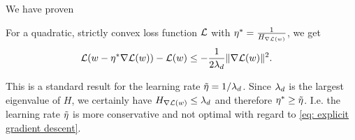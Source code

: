 We have proven
\begin{lemma}\label{lem: improvement guarantee}
	For a quadratic, strictly convex loss function \(\mathcal{L}\) with \(\eta^*=
	\frac{1}{H_{\nabla\mathcal{L}(w)}}\), we get
	\begin{align*}
	\mathcal{L}(w-\eta^*\nabla\mathcal{L}(w)) - \mathcal{L}(w)
	&\le -\frac1{2\lambda_d} \|\nabla\mathcal{L}(w)\|^2.
	\end{align*}	
\end{lemma}
\begin{remark}
	This is a standard result for the learning rate \(\tilde{\eta}=1/\lambda_d\).
	Since \(\lambda_d\) is the largest eigenvalue of \(H\), we certainly
	have \(H_{\nabla\mathcal{L}(w)}\le \lambda_d\) and therefore \(\eta^* \ge
	\tilde{\eta}\). I.e. the learning rate \(\tilde{\eta}\) is more conservative
	and not optimal with regard to \eqref{eq: explicit gradient descent}.
\end{remark}

